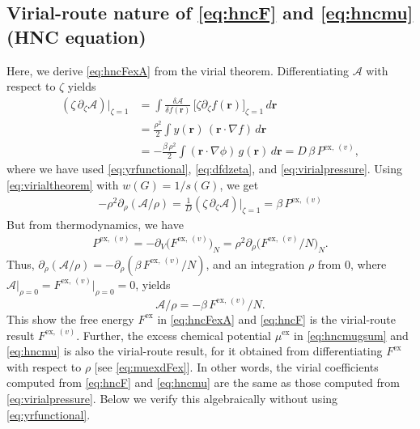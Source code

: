 \documentclass[preprint]{revtex4-1}
\newcommand{\vct}[1]{\mathbf{#1}}
\providecommand{\vr}{} %
\renewcommand{\vr}{\vct{r}}
\newcommand{\supex}[1]{ { { #1 }^{ \mathrm{ex} } } }
\newcommand{\supexv}[1]{ { { #1 }^{ \mathrm{ex}, \, (v) } } }
\newcommand{\Pexv}{\supexv{P}}
\newcommand{\Fex}{\supex{F}}
\newcommand{\Fexv}{\supexv{F}}
\newcommand{\muex}{\supex{\mu}}
\newcommand{\A}{\mathcal{A}}
\begin{document}
\subsection{\label{sec:vthnc}Virial-route nature of \eqref{eq:hncF} and \eqref{eq:hncmu} (HNC equation)}

Here, we derive \eqref{eq:hncFexA} from the virial theorem.
%
Differentiating $\A$ with respect to $\zeta$ yields
\begin{align*}
  (\zeta \, \partial_\zeta \A) \big|_{\zeta = 1}
&=
  \int \frac{ \delta \A } { \delta f(\vr) } \,
  \big[ \zeta \partial_\zeta f(\vr) \big]_{\zeta = 1} \, d\vr
  \\
&=
  \frac{\rho^2}{2}
  \int y(\vr) \,
  (\vr \cdot \nabla f) \, d\vr
  \\
&=
  -\frac{ \beta \, \rho^2}{2}
  \int (\vr \cdot \nabla \phi) \, g(\vr) \, d\vr
= D \, \beta \, \Pexv,
\end{align*}
where we have used \eqref{eq:yrfunctional},
\eqref{eq:dfdzeta}, and \eqref{eq:virialpressure}.
%
Using \eqref{eq:virialtheorem}
with $w(G) = 1/s(G)$, we get
\begin{align*}
  -\rho^2 \partial_\rho ( \A/\rho )
=
  \frac{1}{D} (\zeta \, \partial_\zeta \A) \big|_{\zeta = 1}
=
  \beta \, \Pexv
\end{align*}
%
But from thermodynamics, we have
\begin{align*}
  \Pexv
=
  -\partial_V \bigl( \Fexv \bigr)_N
=
  \rho^2 \partial_\rho \bigl( \Fexv/N \bigr)_N.
\end{align*}
%
Thus,
$\partial_\rho (\A/\rho)  = -\partial_\rho( \beta \, \Fexv/N )$,
and an integration $\rho$ from 0,
where $\A \big|_{\rho = 0} = \Fexv \big|_{\rho = 0} = 0$, yields
\[
  \A/\rho = -\beta \, \Fexv/N.
\]
This show the free energy $\Fex$ in \eqref{eq:hncFexA} and \eqref{eq:hncF}
is the virial-route result $\Fexv$.
%
%
Further, the excess chemical potential
$\muex$ in \eqref{eq:hncmugsum} and \eqref{eq:hncmu}
is also the virial-route result,
for it obtained from differentiating $\Fex$
with respect to $\rho$
[see \eqref{eq:muexdFex}].
%
In other words,
the virial coefficients computed from
\eqref{eq:hncF} and \eqref{eq:hncmu}
are the same as those computed from
\eqref{eq:virialpressure}.
%
Below we verify this algebraically
without using \eqref{eq:yrfunctional}.
\end{document}
